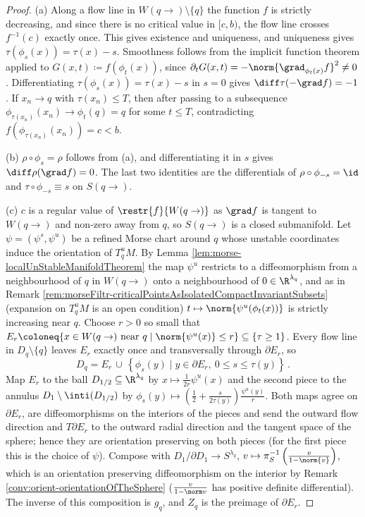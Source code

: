 \begin{proof}
	(a) Along a flow line in $W(q\to)\setminus\{q\}$ the function $f$ is strictly decreasing, and since there is no critical value in $[c,b)$, the flow line crosses $f^{-1}(c)$ exactly once. This gives existence and uniqueness, and uniqueness gives $\tau(\phi_s(x))=\tau(x)-s$. Smoothness follows from the implicit function theorem applied to $G(x,t)\coloneq f(\phi_t(x))$, since $\partial_tG(x,t)=-\norm{\grad_{\phi_t(x)}f}^2\neq 0$. Differentiating $\tau(\phi_s(x))=\tau(x)-s$ in $s=0$ gives $\diff\tau(-\grad f)=-1$. If $x_n\to q$ with $\tau(x_n)\leq T$, then after passing to a subsequence $\phi_{\tau(x_n)}(x_n)\to\phi_{t}(q)=q$ for some $t\le T$, contradicting $f(\phi_{\tau(x_n)}(x_n))=c<b$.
	
	(b) $\rho\circ\phi_s=\rho$ follows from (a), and differentiating it in $s$ gives $\diff\rho(\grad f)=0$. The last two identities are the differentials of $\rho\circ\phi_{-s}=\id$ and $\tau\circ\phi_{-s}\equiv s$ on $S(q\to)$.
	
	(c) $c$ is a regular value of $\restr{f}{W(q\to)}$ as $\grad f$ is tangent to $W(q\to)$ and non-zero away from $q$, so $S(q\to)$ is a closed submanifold. Let $\psi=(\psi^s,\psi^u)$ be a refined Morse chart around $q$ whose unstable coordinates induce the orientation of $T^u_qM$. By Lemma \ref{lem:morse-localUnStableManifoldTheorem} the map $\psi^u$ restricts to a diffeomorphism from a neighbourhood of $q$ in $W(q\to)$ onto a neighbourhood of $0\in\R^{\lambda_q}$, and as in Remark \ref{rem:morseFiltr-criticalPointsAsIsolatedCompactInvariantSubsets} (expansion on $T^u_qM$ is an open condition) $t\mapsto\norm{\psi^u(\phi_t(x))}$ is strictly increasing near $q$. Choose $r>0$ so small that $E_r\coloneq\{x\in W(q\to)\text{ near } q\mid \norm{\psi^u(x)}\leq r\}\subseteq\{\tau\geq 1\}$. Every flow line in $D_q\setminus\{q\}$ leaves $E_r$ exactly once and transversally through $\partial E_r$, so
	\begin{equation*}
		D_q=E_r\,\cup\,\left\{\phi_s(y)\mid y\in\partial E_r,\ 0\leq s\leq\tau(y)\right\}\,.
	\end{equation*}
	Map $E_r$ to the ball $D_{1/2}\subseteq\R^{\lambda_q}$ by $x\mapsto\frac{1}{2r}\psi^u(x)$ and the second piece to the annulus $D_1\setminus \inti(D_{1/2})$ by $\phi_s(y)\mapsto \left(\frac12+\frac{s}{2\tau(y)}\right)\frac{\psi^u(y)}{r}$. Both maps agree on $\partial E_r$, are diffeomorphisms on the interiors of the pieces and send the outward flow direction and $T\partial E_r$ to the outward radial direction and the tangent space of the sphere; hence they are orientation preserving on both pieces (for the first piece this is the choice of $\psi$). Compose with $D_1/\partial D_1\to S^{\lambda_q}$, $v\mapsto\pi_S^{-1}\left(\frac{v}{1-\norm{v}}\right)$, which is an orientation preserving diffeomorphism on the interior by Remark \ref{conv:orient-orientationOfTheSphere} ($\frac{v}{1-\norm v}$ has positive definite differential). The inverse of this composition is $g_q$, and $Z_q$ is the preimage of $\partial E_r$.
\end{proof}

